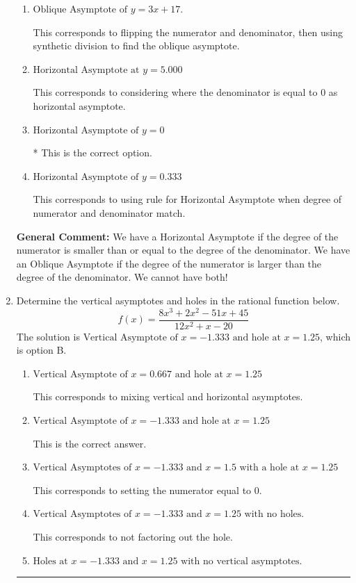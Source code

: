 \documentclass{extbook}[14pt]
\newcommand{\litem}[1]{\item #1

\rule{\textwidth}{0.4pt}}
\begin{document}
\begin{enumerate}
{\begin{enumerate}[label=\Alph*.]
This corresponds to believing there can be both a horizontal and oblique asymptote.
\item \( \text{Oblique Asymptote of } y = 3x + 17. \)

This corresponds to flipping the numerator and denominator, then using synthetic division to find the oblique asymptote.
\item \( \text{Horizontal Asymptote at } y = 5.000 \)

This corresponds to considering where the denominator is equal to 0 as horizontal asymptote.
\item \( \text{Horizontal Asymptote of } y = 0 \)

* This is the correct option.
\item \( \text{Horizontal Asymptote of } y = 0.333  \)

This corresponds to using rule for Horizontal Asymptote when degree of numerator and denominator match.
\end{enumerate}

\textbf{General Comment:} We have a Horizontal Asymptote if the degree of the numerator is smaller than or equal to the degree of the denominator. We have an Oblique Asymptote if the degree of the numerator is larger than the degree of the denominator. We cannot have both!
}
\litem{
Determine the vertical asymptotes and holes in the rational function below.
\[ f(x) = \frac{8x^{3} +2 x^{2} -51 x + 45}{12x^{2} +x -20} \]The solution is \( \text{Vertical Asymptote of } x = -1.333 \text{ and hole at } x = 1.25 \), which is option B.\begin{enumerate}[label=\Alph*.]
\item \( \text{Vertical Asymptote of } x = 0.667 \text{ and hole at } x = 1.25 \)

This corresponds to mixing vertical and horizontal asymptotes.
\item \( \text{Vertical Asymptote of } x = -1.333 \text{ and hole at } x = 1.25 \)

This is the correct answer.
\item \( \text{Vertical Asymptotes of } x = -1.333 \text{ and } x = 1.5 \text{ with a hole at } x = 1.25 \)

This corresponds to setting the numerator equal to 0.
\item \( \text{Vertical Asymptotes of } x = -1.333 \text{ and } x = 1.25 \text{ with no holes.} \)

This corresponds to not factoring out the hole.
\item \( \text{Holes at } x = -1.333 \text{ and } x = 1.25 \text{ with no vertical asymptotes.} \)


\end{enumerate}}
\end{enumerate}
\end{document}
